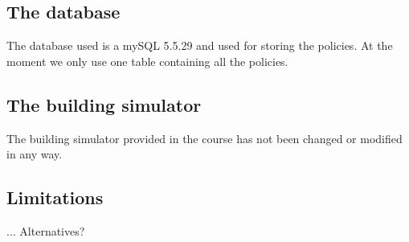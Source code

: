\subsection{The database}
The database used is a mySQL 5.5.29 and used for storing the policies. At the moment we only use one table containing all the policies.

\subsection{The building simulator}
The building simulator provided in the course has not been changed or modified in any way.

\subsection{Limitations}
... Alternatives?
